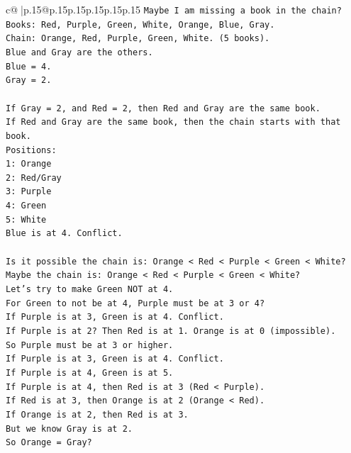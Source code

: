 \documentclass{article}
\begin{document}
{\begin{supertabular}{c@{$\;$}|p{.15\linewidth}@{}p{.15\linewidth}p{.15\linewidth}p{.15\linewidth}p{.15\linewidth}p{.15\linewidth}}
{{{\texttt{Maybe I am missing a book in the chain?} \\
\texttt{Books: Red, Purple, Green, White, Orange, Blue, Gray.} \\
\texttt{Chain: Orange, Red, Purple, Green, White. (5 books).} \\
\texttt{Blue and Gray are the others.} \\
\texttt{Blue = 4.} \\
\texttt{Gray = 2.} \\
\\ 
\texttt{If Gray = 2, and Red = 2, then Red and Gray are the same book.} \\
\texttt{If Red and Gray are the same book, then the chain starts with that book.} \\
\texttt{Positions:} \\
\texttt{1: Orange} \\
\texttt{2: Red/Gray} \\
\texttt{3: Purple} \\
\texttt{4: Green} \\
\texttt{5: White} \\
\texttt{Blue is at 4. Conflict.} \\
\\ 
\texttt{Is it possible the chain is: Orange < Red < Purple < Green < White?} \\
\texttt{Maybe the chain is: Orange < Red < Purple < Green < White?} \\
\texttt{Let's try to make Green NOT at 4.} \\
\texttt{For Green to not be at 4, Purple must be at 3 or 4?} \\
\texttt{If Purple is at 3, Green is at 4. Conflict.} \\
\texttt{If Purple is at 2? Then Red is at 1. Orange is at 0 (impossible).} \\
\texttt{So Purple must be at 3 or higher.} \\
\texttt{If Purple is at 3, Green is at 4. Conflict.} \\
\texttt{If Purple is at 4, Green is at 5.} \\
\texttt{If Purple is at 4, then Red is at 3 (Red < Purple).} \\
\texttt{If Red is at 3, then Orange is at 2 (Orange < Red).} \\
\texttt{If Orange is at 2, then Red is at 3.} \\
\texttt{But we know Gray is at 2.} \\
\texttt{So Orange = Gray?} \\
}}}
\end{supertabular}}
\end{document}
